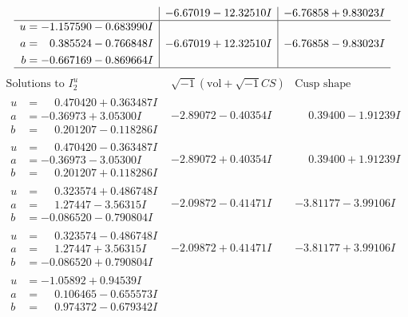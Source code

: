 \documentclass[1p]{elsarticle_modified}
\theoremstyle{definition}
\newcommand{\I}{\sqrt{-1}}
\begin{document}
$$\begin{array}{c|c|c}
 & -6.67019 - 12.32510 I & -6.76858 + 9.83023 I \\ \hline\begin{aligned}
u &= -1.157590 - 0.683990 I \\
a &= \phantom{-}0.385524 - 0.766848 I \\
b &= -0.667169 - 0.869664 I\end{aligned}
 & -6.67019 + 12.32510 I & -6.76858 - 9.83023 I\\
 \hline 
 \end{array}$$\newpage$$\begin{array}{c|c|c}  
\text{Solutions to }I^u_{2}& \I (\text{vol} + \sqrt{-1}CS) & \text{Cusp shape}\\
 \hline 
\begin{aligned}
u &= \phantom{-}0.470420 + 0.363487 I \\
a &= -0.36973 + 3.05300 I \\
b &= \phantom{-}0.201207 - 0.118286 I\end{aligned}
 & -2.89072 - 0.40354 I & \phantom{-}0.39400 - 1.91239 I \\ \hline\begin{aligned}
u &= \phantom{-}0.470420 - 0.363487 I \\
a &= -0.36973 - 3.05300 I \\
b &= \phantom{-}0.201207 + 0.118286 I\end{aligned}
 & -2.89072 + 0.40354 I & \phantom{-}0.39400 + 1.91239 I \\ \hline\begin{aligned}
u &= \phantom{-}0.323574 + 0.486748 I \\
a &= \phantom{-}1.27447 - 3.56315 I \\
b &= -0.086520 - 0.790804 I\end{aligned}
 & -2.09872 - 0.41471 I & -3.81177 - 3.99106 I \\ \hline\begin{aligned}
u &= \phantom{-}0.323574 - 0.486748 I \\
a &= \phantom{-}1.27447 + 3.56315 I \\
b &= -0.086520 + 0.790804 I\end{aligned}
 & -2.09872 + 0.41471 I & -3.81177 + 3.99106 I \\ \hline\begin{aligned}
u &= -1.05892 + 0.94539 I \\
a &= \phantom{-}0.106465 - 0.655573 I \\
b &= \phantom{-}0.974372 - 0.679342 I\end{aligned}

\end{array}$$
\end{document}
